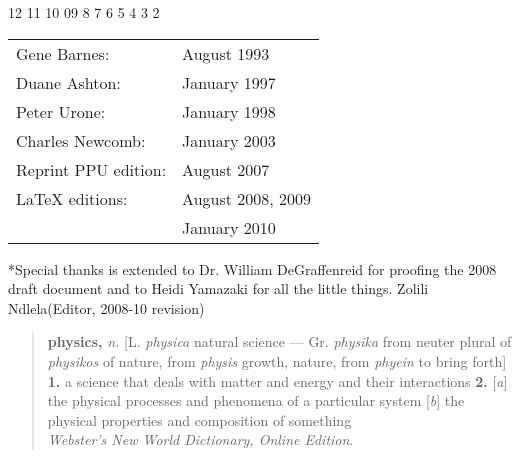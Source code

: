 \begin{center}
12 11 10 09  \hspace{2em}8 7 6 5 4 3 2       
\end{center}
\begin{center}
\begin{tabular}{ll}
Gene Barnes:						& August 1993 \\
Duane Ashton:					& January 1997 \\
Peter Urone:						& January 1998 \\
Charles Newcomb:              	& January 2003 \\
Reprint PPU edition:				& August 2007 \\
LaTeX editions:					& August 2008, 2009\\
											& January 2010 \\

\end{tabular}
\end{center}
\vfill
*Special thanks is extended to Dr. William DeGraffenreid for proofing the 2008 draft document and to Heidi Yamazaki for all the little things.
\hspace*{\fill}Zolili Ndlela\quad(Editor, 2008-10 revision)
\endgroup

\clearpage

\begin{quote}
\textbf{physics,} \textit{n.} [L. \textit{physica} natural science --- Gr. \textit{physika} from neuter plural of \textit{physikos} of nature, from \textit{physis} growth, nature, from \textit{phyein} to bring forth]
  \hspace{1ex} \textbf{1.} a science that deals with matter and energy and their interactions 
  \hspace{1ex} \textbf{2.} [\textit{a}] the physical processes and phenomena of a particular system [\textit{b}] the physical properties and composition of something
      \\[0.5\baselineskip]
  \hspace*{\fill} \textit{Webster's New World Dictionary, Online Edition}.
\end{quote}

